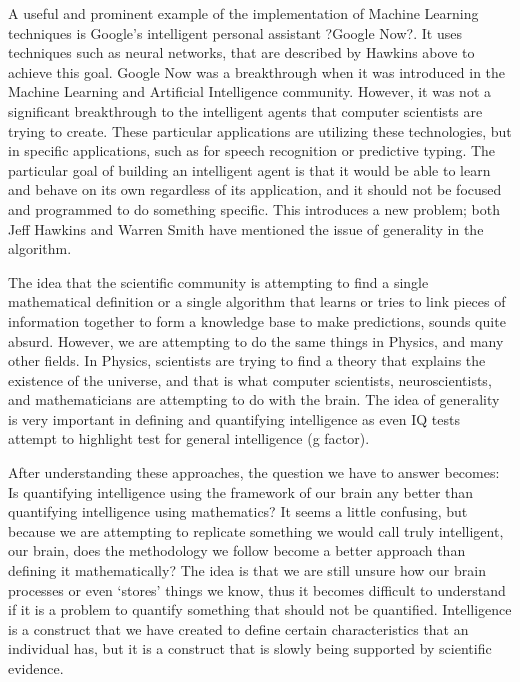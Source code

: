 \documentclass[11pt, oneside]{article}
\begin{document}
\par A useful and prominent example of the implementation of Machine Learning techniques is Google's intelligent personal assistant ?Google Now?. It uses techniques such as neural networks, that are described by Hawkins above to achieve this goal. Google Now was a breakthrough when it was introduced in the Machine Learning and Artificial Intelligence community. However, it was not a significant breakthrough to the intelligent agents that computer scientists are trying to create. These particular applications are utilizing these technologies, but in specific applications, such as for speech recognition or predictive typing. The particular goal of building an intelligent agent is that it would be able to learn and behave on its own regardless of its application, and it should not be focused and programmed to do something specific. This introduces a new problem; both Jeff Hawkins and Warren Smith have mentioned the issue of generality in the algorithm.

\par The idea that the scientific community is attempting to find a single mathematical definition or a single algorithm that learns or tries to link pieces of information together to form a knowledge base to make predictions, sounds quite absurd. However, we are attempting to do the same things in Physics, and many other fields. In Physics, scientists are trying to find a theory that explains the existence of the universe, and that is what computer scientists, neuroscientists, and mathematicians are attempting to do with the brain. The idea of generality is very important in defining and quantifying intelligence as even IQ tests attempt to highlight test for general intelligence (g factor). 

\par After understanding these approaches, the question we have to answer becomes: Is quantifying intelligence using the framework of our brain any better than quantifying intelligence using mathematics? It seems a little confusing, but because we are attempting to replicate something we would call truly intelligent, our brain, does the methodology we follow become a better approach than defining it mathematically? The idea is that we are still unsure how our brain processes or even `stores' things we know, thus it becomes difficult to understand if it is a problem to quantify something that should not be quantified. Intelligence is a construct that we have created to define certain characteristics that an individual has, but it is a construct that is slowly being supported by scientific evidence. 
\end{document}
